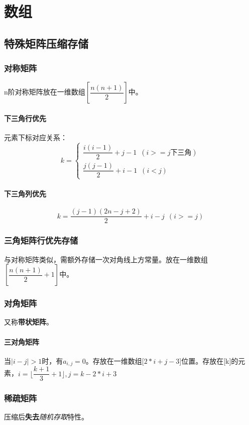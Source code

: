
\chapter{数组}

\section{特殊矩阵压缩存储}

\subsection{对称矩阵}
n阶对称矩阵放在一维数组\([\dfrac{n(n + 1)}{2}]\)中。

\subsubsection{下三角行优先}
元素下标对应关系：
\[k = \begin{cases}
    \dfrac{i(i - 1)}{2} + j - 1\,\,\,(i >= j\text{下三角}) \\
    \dfrac{j(j - 1)}{2} + i - 1\,\,\,(i < j)
\end{cases}\]


\subsubsection{下三角列优先}
\[k = \dfrac{(j - 1)(2n - j + 2)}{2} + i - j\ \ (i >= j)\]


\subsection{三角矩阵行优先存储}
与对称矩阵类似，需额外存储一次对角线上方常量。放在一维数组\([\dfrac{n(n + 1)}{2} + 1]\)中。


\subsection{对角矩阵}
又称\textbf{带状矩阵}。

\subsubsection{三对角矩阵}
当\(|i - j| > 1\)时，有\(a_{i, j} = 0\)。存放在一维数组[\(2 * i + j - 3\)]位置。存放在[k]的元素，\(i = \lfloor\dfrac{k + 1}{3} + 1\rfloor, j = k - 2 * i + 3\)


\subsection{稀疏矩阵}
压缩后\textbf{失去}\textit{随机存取}特性。

